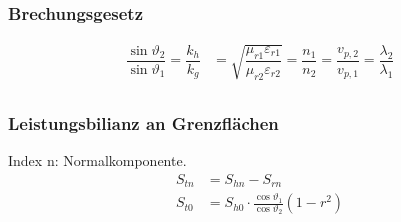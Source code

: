 \subsubsection{Brechungsgesetz}
\begin{align*}
    \dfrac{\sin \vartheta_{2}}{\sin \vartheta_{1}} = \dfrac{k_{h}}{k_{g}} & = \sqrt{\dfrac{\mu_{r 1} \varepsilon_{r 1}}{\mu_{r 2} \varepsilon_{r 2}}} = \dfrac{n_{1}}{n_{2}} = \dfrac{v_{p, 2}}{v_{p, 1}} = \dfrac{\lambda_{2}}{\lambda_{1}} \\
\end{align*}

\subsubsection{Leistungsbilianz an Grenzflächen}
Index n: Normalkomponente.
\begin{align*}
	S_{tn} &= S_{hn} - S_{rn}\\ 
	S_{t0} &= S_{h0}\cdot \frac{\cos\vartheta_{1}}{\cos\vartheta_{2}}(1-r^2)
\end{align*}





\newpage
